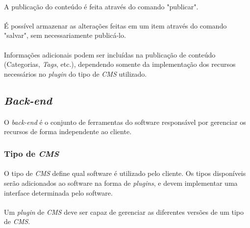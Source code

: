 \documentclass[a4paper,12pt]{article}
\def\blog{\emph{CMS}}
\def\plugin{\emph{plugin}}
\begin{document}
\paragraph{}
A publicação do conteúdo é feita através do comando "publicar".

\paragraph{}
É possível armazenar as alterações feitas em um item através do comando
"salvar", sem necessariamente publicá-lo.

\paragraph{}
Informações adicionais podem ser incluídas na publicação de conteúdo
(Categorias, \emph{Tags}, etc.), dependendo somente da implementação
dos recursos necessários no \plugin{} do tipo de \blog{} utilizado. 

\subsection{\emph{Back-end}}

\paragraph{}
O \emph{back-end} é o conjunto de ferramentas do software responsável por
gerenciar os recursos de forma independente ao cliente.

\subsubsection{Tipo de \blog{}} \label{tipoblog}

\paragraph{}
O tipo de \blog{} define qual software é utilizado pelo cliente. Os tipos
disponíveis serão adicionados ao software na forma de \emph{plugins}, e devem
implementar uma interface determinada pelo software.


\paragraph{}
Um \emph{plugin} de \blog{} deve ser capaz de gerenciar as diferentes versões de
um tipo de \blog{}.
\end{document}
